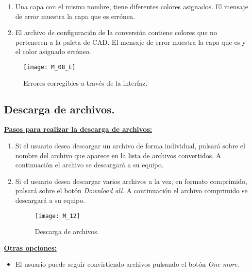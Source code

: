 \begin{enumerate}
\item Una capa con el mismo nombre, tiene diferentes colores asignados. El mensaje de error muestra la capa que es errónea.

\item El archivo de configuración de la conversión contiene colores que no pertenecen a la paleta de CAD. El mensaje de error muestra la capa que es y el color asignado erróneo.

\end{enumerate}
\begin{figure}[H]
	\centering
	\texttt{[image: M\_08\_E]}
	\caption{Errores corregibles a través de la interfaz.}
	\label{fig:M_08_E}
\end{figure}

\subsection{Descarga de archivos.}


\textbf{\underline{Pasos para realizar la descarga de archivos:} }

\begin{enumerate}

\item Si el usuario desea descargar un archivo de forma individual, pulsará sobre el nombre del archivo que aparece en la lista de archivos convertidos. A continuación el archivo se descargará a su equipo.

\item Si el usuario desea descargar varios archivos a la vez, en formato comprimido, pulsará sobre el botón \emph{Download all}. A continuación el archivo comprimido se descargará a su equipo.

\begin{figure}[H]
	\centering
	\texttt{[image: M\_12]}
	\caption{Descarga de archivos.}
	\label{fig:M_12}
\end{figure}

\end{enumerate} 


\newpage
\textbf{\underline{Otras opciones:} }

\begin{itemize}

\item El usuario puede seguir convirtiendo archivos pulsando el botón \emph{One more}.

\end{itemize}

